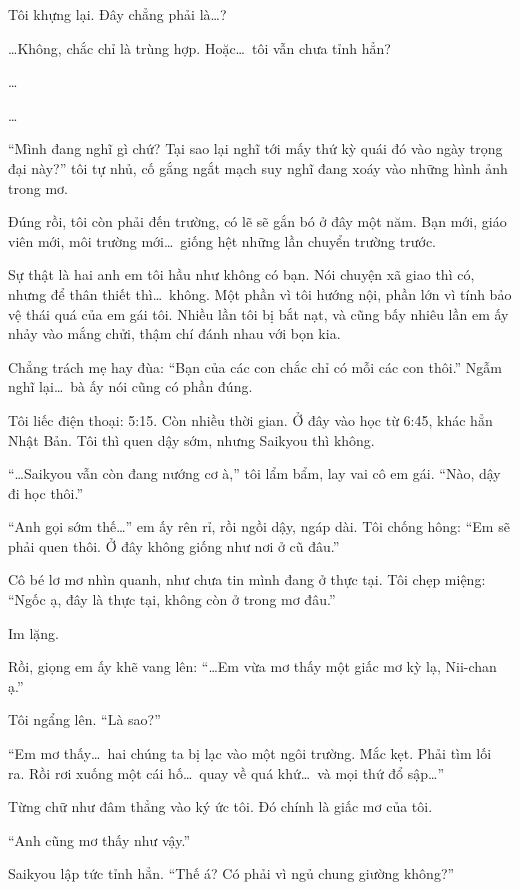 \documentclass[../main.tex]{subfiles}
\begin{document}
Tôi khựng lại. Đây chẳng phải là\dots?

\dots Không, chắc chỉ là trùng hợp. Hoặc\dots\ tôi vẫn chưa tỉnh hẳn?

\dots

\dots

``Mình đang nghĩ gì chứ? Tại sao lại nghĩ tới mấy thứ kỳ quái đó vào ngày trọng đại này?'' tôi tự nhủ, cố gắng ngắt mạch suy nghĩ đang xoáy vào những hình ảnh trong mơ.

Đúng rồi, tôi còn phải đến trường, có lẽ sẽ gắn bó ở đây một năm. Bạn mới, giáo viên mới, môi trường mới\dots\ giống hệt những lần chuyển trường trước.

Sự thật là hai anh em tôi hầu như không có bạn. Nói chuyện xã giao thì có, nhưng để thân thiết thì\dots\ không. Một phần vì tôi hướng nội, phần lớn vì tính bảo vệ thái quá của em gái tôi. Nhiều lần tôi bị bắt nạt, và cũng bấy nhiêu lần em ấy nhảy vào mắng chửi, thậm chí đánh nhau với bọn kia.

Chẳng trách mẹ hay đùa: ``Bạn của các con chắc chỉ có mỗi các con thôi.'' Ngẫm nghĩ lại\dots\ bà ấy nói cũng có phần đúng.

Tôi liếc điện thoại: 5:15. Còn nhiều thời gian. Ở đây vào học từ 6:45, khác hẳn Nhật Bản. Tôi thì quen dậy sớm, nhưng Saikyou thì không.

``\dots Saikyou vẫn còn đang nướng cơ à,'' tôi lẩm bẩm, lay vai cô em gái. ``Nào, dậy đi học thôi.''

``Anh gọi sớm thế\dots'' em ấy rên rỉ, rồi ngồi dậy, ngáp dài. Tôi chống hông: ``Em sẽ phải quen thôi. Ở đây không giống như nơi ở cũ đâu.''

Cô bé lơ mơ nhìn quanh, như chưa tin mình đang ở thực tại. Tôi chẹp miệng: ``Ngốc ạ, đây là thực tại, không còn ở trong mơ đâu.''

Im lặng.

Rồi, giọng em ấy khẽ vang lên: ``\dots Em vừa mơ thấy một giấc mơ kỳ lạ, Nii-chan ạ.''

Tôi ngẩng lên. ``Là sao?''

``Em mơ thấy\dots\ hai chúng ta bị lạc vào một ngôi trường. Mắc kẹt. Phải tìm lối ra. Rồi rơi xuống một cái hố\dots\ quay về quá khứ\dots\ và mọi thứ đổ sập\dots''

Từng chữ như đâm thẳng vào ký ức tôi. Đó chính là giấc mơ của tôi.

``Anh cũng mơ thấy như vậy.''

Saikyou lập tức tỉnh hẳn. ``Thế á? Có phải vì ngủ chung giường không?''
\end{document}
